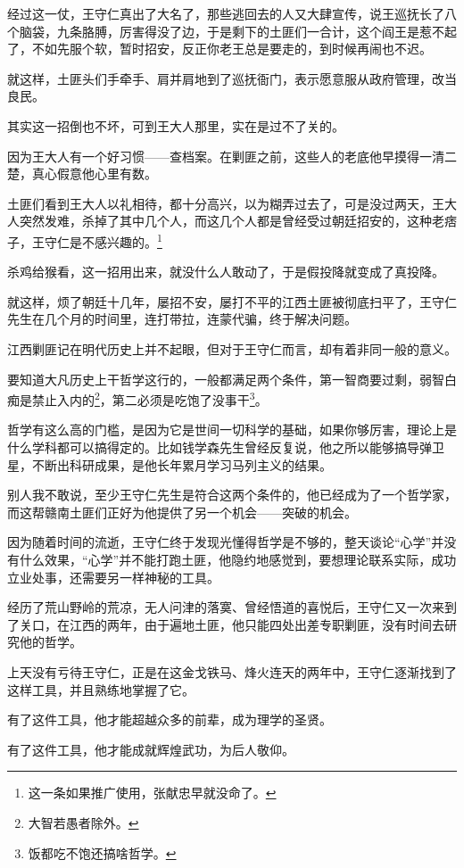 \begin{multicols}{\theparacolNo}
经过这一仗，王守仁真出了大名了，那些逃回去的人又大肆宣传，说王巡抚长了八个脑袋，九条胳膊，厉害得没了边，于是剩下的土匪们一合计，这个阎王是惹不起了，不如先服个软，暂时招安，反正你老王总是要走的，到时候再闹也不迟。

就这样，土匪头们手牵手、肩并肩地到了巡抚衙门，表示愿意服从政府管理，改当良民。

其实这一招倒也不坏，可到王大人那里，实在是过不了关的。

因为王大人有一个好习惯——查档案。在剿匪之前，这些人的老底他早摸得一清二楚，真心假意他心里有数。

土匪们看到王大人以礼相待，都十分高兴，以为糊弄过去了，可是没过两天，王大人突然发难，杀掉了其中几个人，而这几个人都是曾经受过朝廷招安的，这种老痞子，王守仁是不感兴趣的。\footnote{这一条如果推广使用，张献忠早就没命了。}

杀鸡给猴看，这一招用出来，就没什么人敢动了，于是假投降就变成了真投降。

就这样，烦了朝廷十几年，屡招不安，屡打不平的江西土匪被彻底扫平了，王守仁先生在几个月的时间里，连打带拉，连蒙代骗，终于解决问题。

江西剿匪记在明代历史上并不起眼，但对于王守仁而言，却有着非同一般的意义。

要知道大凡历史上干哲学这行的，一般都满足两个条件，第一智商要过剩，弱智白痴是禁止入内的\footnote{大智若愚者除外。}，第二必须是吃饱了没事干\footnote{饭都吃不饱还搞啥哲学。}。

哲学有这么高的门槛，是因为它是世间一切科学的基础，如果你够厉害，理论上是什么学科都可以搞得定的。比如钱学森先生曾经反复说，他之所以能够搞导弹卫星，不断出科研成果，是他长年累月学习马列主义的结果。

别人我不敢说，至少王守仁先生是符合这两个条件的，他已经成为了一个哲学家，而这帮赣南土匪们正好为他提供了另一个机会——突破的机会。

因为随着时间的流逝，王守仁终于发现光懂得哲学是不够的，整天谈论“心学”并没有什么效果，“心学”并不能打跑土匪，他隐约地感觉到，要想理论联系实际，成功立业处事，还需要另一样神秘的工具。

经历了荒山野岭的荒凉，无人问津的落寞、曾经悟道的喜悦后，王守仁又一次来到了关口，在江西的两年，由于遍地土匪，他只能四处出差专职剿匪，没有时间去研究他的哲学。

上天没有亏待王守仁，正是在这金戈铁马、烽火连天的两年中，王守仁逐渐找到了这样工具，并且熟练地掌握了它。

有了这件工具，他才能超越众多的前辈，成为理学的圣贤。

有了这件工具，他才能成就辉煌武功，为后人敬仰。


\end{multicols}
